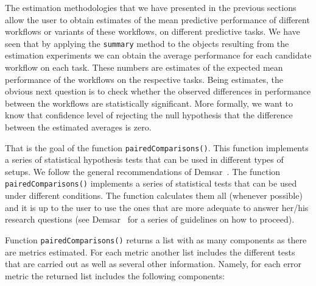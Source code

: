 \documentclass[10pt,a4paper]{article}\usepackage[]{graphicx}\usepackage[]{color}
\begin{document}
The estimation methodologies that we have presented in the previous
sections allow the user to obtain estimates of the mean predictive
performance of different workflows or variants of these workflows, on
different predictive tasks. We have seen that by applying the
\texttt{summary} method to the objects resulting from the estimation experiments
we can obtain the average performance for each candidate workflow on
each task. These numbers are estimates of the expected mean
performance of the workflows on the respective tasks. Being estimates,
the obvious next question is to check whether the observed differences
in performance between the workflows are statistically
significant. More formally, we want to know that confidence level of rejecting the null hypothesis that the difference between the estimated averages is zero.

That is the goal of the function
\texttt{pairedComparisons()}. This function implements a series of statistical hypothesis tests that can be used in different types of setups. We follow the general recommendations of Demsar~\cite{Dem06}. The function \texttt{pairedComparisons()} implements a series of statistical tests that can be used under different conditions. The function calculates them all (whenever possible) and it is up to the user to use the ones that are more adequate to answer her/his research questions (see Demsar~\cite{Dem06} for a series of guidelines on how to proceed).

Function \texttt{pairedComparisons()} returns a list with as many components as there are metrics estimated. For each metric another list includes the different tests that are carried out as well as several other information. Namely, for each error metric the returned list includes the following components:
\end{document}
